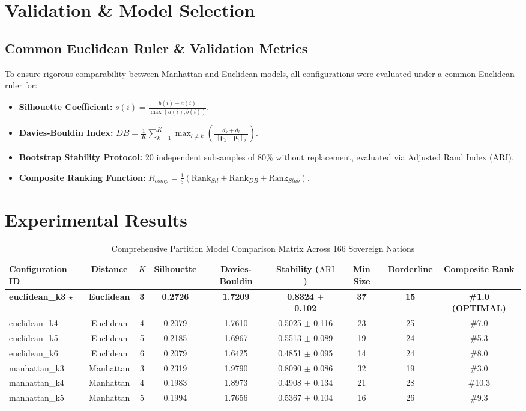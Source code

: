 \documentclass[conference]{IEEEtran}
\begin{document}
\section{Validation \& Model Selection}

\subsection{Common Euclidean Ruler \& Validation Metrics}
To ensure rigorous comparability between Manhattan and Euclidean models, all configurations were evaluated under a common Euclidean ruler for:
\begin{itemize}
    \item \textbf{Silhouette Coefficient:} $s(i) = \frac{b(i) - a(i)}{\max(a(i), b(i))}$.
    \item \textbf{Davies-Bouldin Index:} $DB = \frac{1}{K} \sum_{k=1}^K \max_{l \neq k} \left(\frac{\bar{d}_k + \bar{d}_l}{\|\boldsymbol{\mu}_k - \boldsymbol{\mu}_l\|_2}\right)$.
    \item \textbf{Bootstrap Stability Protocol:} 20 independent subsamples of 80\% without replacement, evaluated via Adjusted Rand Index ($\text{ARI}$).
    \item \textbf{Composite Ranking Function:} $R_{comp} = \frac{1}{3} (\text{Rank}_{Sil} + \text{Rank}_{DB} + \text{Rank}_{Stab})$.
\end{itemize}

\section{Experimental Results}

\begin{table}[t]
\caption{Comprehensive Partition Model Comparison Matrix Across 166 Sovereign Nations}
\label{tab:models}
\centering
\begin{tabular}{lcccccccc}
\toprule
\textbf{Configuration ID} & \textbf{Distance} & $K$ & \textbf{Silhouette} & \textbf{Davies-Bouldin} & \textbf{Stability ($\text{ARI}$)} & \textbf{Min Size} & \textbf{Borderline} & \textbf{Composite Rank} \\
\midrule
\textbf{euclidean\_k3 $\star$} & \textbf{Euclidean} & \textbf{3} & \textbf{0.2726} & \textbf{1.7209} & \textbf{0.8324 $\pm$ 0.102} & \textbf{37} & \textbf{15} & \textbf{\#1.0 (OPTIMAL)} \\
euclidean\_k4 & Euclidean & 4 & 0.2079 & 1.7610 & 0.5025 $\pm$ 0.116 & 23 & 25 & \#7.0 \\
euclidean\_k5 & Euclidean & 5 & 0.2185 & 1.6967 & 0.5513 $\pm$ 0.089 & 19 & 24 & \#5.3 \\
euclidean\_k6 & Euclidean & 6 & 0.2079 & 1.6425 & 0.4851 $\pm$ 0.095 & 14 & 24 & \#8.0 \\
manhattan\_k3 & Manhattan & 3 & 0.2319 & 1.9790 & 0.8090 $\pm$ 0.086 & 32 & 19 & \#3.0 \\
manhattan\_k4 & Manhattan & 4 & 0.1983 & 1.8973 & 0.4908 $\pm$ 0.134 & 21 & 28 & \#10.3 \\
manhattan\_k5 & Manhattan & 5 & 0.1994 & 1.7656 & 0.5367 $\pm$ 0.104 & 16 & 26 & \#9.3 \\
\bottomrule
\end{tabular}
\end{table}
\end{document}
